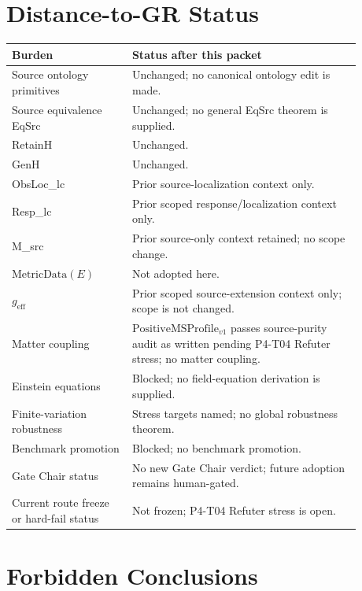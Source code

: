 \documentclass[11pt]{article}
\newcommand{\PMSProf}{\mathrm{PositiveMSProfile}_{v1}}
\newcommand{\MetricData}{\mathrm{MetricData}}
\newcommand{\geff}{g_{\mathrm{eff}}}
\begin{document}
\section{Distance-to-GR Status}

\begin{longtable}{p{0.30\linewidth}p{0.58\linewidth}}
\toprule
Burden & Status after this packet \\
\midrule
Source ontology primitives & Unchanged; no canonical ontology edit is made. \\
Source equivalence EqSrc & Unchanged; no general EqSrc theorem is supplied. \\
RetainH & Unchanged. \\
GenH & Unchanged. \\
ObsLoc\_lc & Prior source-localization context only. \\
Resp\_lc & Prior scoped response/localization context only. \\
M\_src & Prior source-only context retained; no scope change. \\
\(\MetricData(E)\) & Not adopted here. \\
\(\geff\) & Prior scoped source-extension context only; scope is not changed. \\
Matter coupling & \(\PMSProf\) passes source-purity audit as written pending P4-T04 Refuter stress; no matter coupling. \\
Einstein equations & Blocked; no field-equation derivation is supplied. \\
Finite-variation robustness & Stress targets named; no global robustness theorem. \\
Benchmark promotion & Blocked; no benchmark promotion. \\
Gate Chair status & No new Gate Chair verdict; future adoption remains human-gated. \\
Current route freeze or hard-fail status & Not frozen; P4-T04 Refuter stress is open. \\
\bottomrule
\end{longtable}

\section{Forbidden Conclusions}
\end{document}
